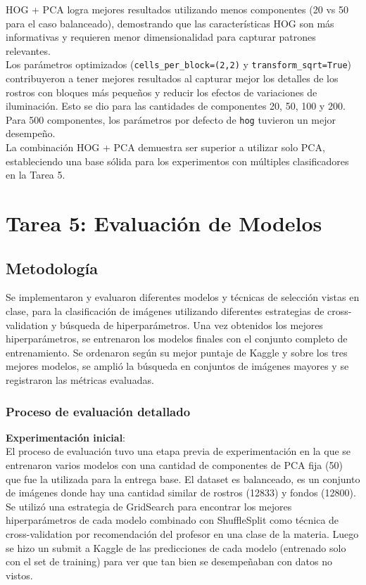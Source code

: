 \documentclass{article}
\begin{document}
HOG + PCA logra mejores resultados utilizando menos componentes (20 vs 50 para el caso balanceado), demostrando que las características HOG son más informativas y requieren menor dimensionalidad para capturar patrones relevantes.\\

Los parámetros optimizados (\texttt{cells\_per\_block=(2,2)} y \texttt{transform\_sqrt=True}) contribuyeron a tener mejores resultados al capturar mejor los detalles de los rostros con bloques más pequeños y reducir los efectos de variaciones de iluminación. Esto se dio para las cantidades de componentes 20, 50, 100 y 200. Para 500 componentes, los parámetros por defecto de \texttt{hog} tuvieron un mejor desempeño.\\

La combinación HOG + PCA demuestra ser superior a utilizar solo PCA, estableciendo una base sólida para los experimentos con múltiples clasificadores en la Tarea 5.

\pagebreak

\section*{Tarea 5: Evaluación de Modelos}

\subsection*{Metodología}

Se implementaron y evaluaron diferentes modelos y técnicas de selección vistas en clase, para la clasificación de imágenes utilizando diferentes estrategias de cross-validation y búsqueda de hiperparámetros. Una vez obtenidos los mejores hiperparámetros, se entrenaron los modelos finales con el conjunto completo de entrenamiento. Se ordenaron según su mejor puntaje de Kaggle y sobre los tres mejores modelos, se amplió la búsqueda en conjuntos de imágenes mayores y se registraron las métricas evaluadas.

\subsubsection*{Proceso de evaluación detallado}

\textbf{Experimentación inicial}:\\

El proceso de evaluación tuvo una etapa previa de experimentación en la que se entrenaron varios modelos con una cantidad de componentes de PCA fija (50) que fue la utilizada para la entrega base. El dataset es balanceado, es un conjunto de imágenes donde hay una cantidad similar de rostros (12833) y fondos (12800). Se utilizó una estrategia de GridSearch para encontrar los mejores hiperparámetros de cada modelo combinado con ShuffleSplit como técnica de cross-validation por recomendación del profesor en una clase de la materia. Luego se hizo un submit a Kaggle de las predicciones de cada modelo (entrenado solo con el set de training) para ver que tan bien se desempeñaban con datos no vistos.\\
\end{document}
